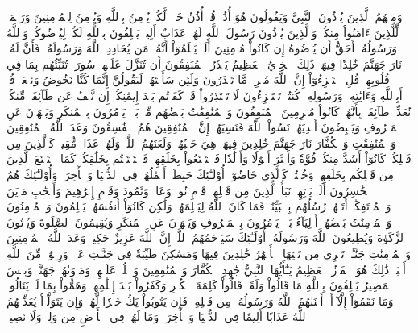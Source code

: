 وَمِنۡهُمُ ٱلَّذِينَ يُؤۡذُونَ ٱلنَّبِيَّ وَيَقُولُونَ هُوَ أُذُنٞۚ قُلۡ أُذُنُ خَيۡرٖ لَّكُمۡ يُؤۡمِنُ بِٱللَّهِ وَيُؤۡمِنُ لِلۡمُؤۡمِنِينَ وَرَحۡمَةٞ لِّلَّذِينَ ءَامَنُواْ مِنكُمۡۚ وَٱلَّذِينَ يُؤۡذُونَ رَسُولَ ٱللَّهِ لَهُمۡ عَذَابٌ أَلِيمٞ
يَحۡلِفُونَ بِٱللَّهِ لَكُمۡ لِيُرۡضُوكُمۡ وَٱللَّهُ وَرَسُولُهُۥٓ أَحَقُّ أَن يُرۡضُوهُ إِن كَانُواْ مُؤۡمِنِينَ
أَلَمۡ يَعۡلَمُوٓاْ أَنَّهُۥ مَن يُحَادِدِ ٱللَّهَ وَرَسُولَهُۥ فَأَنَّ لَهُۥ نَارَ جَهَنَّمَ خَٰلِدٗا فِيهَاۚ ذَٰلِكَ ٱلۡخِزۡيُ ٱلۡعَظِيمُ
يَحۡذَرُ ٱلۡمُنَٰفِقُونَ أَن تُنَزَّلَ عَلَيۡهِمۡ سُورَةٞ تُنَبِّئُهُم بِمَا فِي قُلُوبِهِمۡۚ قُلِ ٱسۡتَهۡزِءُوٓاْ إِنَّ ٱللَّهَ مُخۡرِجٞ مَّا تَحۡذَرُونَ
وَلَئِن سَأَلۡتَهُمۡ لَيَقُولُنَّ إِنَّمَا كُنَّا نَخُوضُ وَنَلۡعَبُۚ قُلۡ أَبِٱللَّهِ وَءَايَٰتِهِۦ وَرَسُولِهِۦ كُنتُمۡ تَسۡتَهۡزِءُونَ
لَا تَعۡتَذِرُواْ قَدۡ كَفَرۡتُم بَعۡدَ إِيمَٰنِكُمۡۚ إِن نَّعۡفُ عَن طَآئِفَةٖ مِّنكُمۡ نُعَذِّبۡ طَآئِفَةَۢ بِأَنَّهُمۡ كَانُواْ مُجۡرِمِينَ
ٱلۡمُنَٰفِقُونَ وَٱلۡمُنَٰفِقَٰتُ بَعۡضُهُم مِّنۢ بَعۡضٖۚ يَأۡمُرُونَ بِٱلۡمُنكَرِ وَيَنۡهَوۡنَ عَنِ ٱلۡمَعۡرُوفِ وَيَقۡبِضُونَ أَيۡدِيَهُمۡۚ نَسُواْ ٱللَّهَ فَنَسِيَهُمۡۚ إِنَّ ٱلۡمُنَٰفِقِينَ هُمُ ٱلۡفَٰسِقُونَ
وَعَدَ ٱللَّهُ ٱلۡمُنَٰفِقِينَ وَٱلۡمُنَٰفِقَٰتِ وَٱلۡكُفَّارَ نَارَ جَهَنَّمَ خَٰلِدِينَ فِيهَاۚ هِيَ حَسۡبُهُمۡۚ وَلَعَنَهُمُ ٱللَّهُۖ وَلَهُمۡ عَذَابٞ مُّقِيمٞ
كَٱلَّذِينَ مِن قَبۡلِكُمۡ كَانُوٓاْ أَشَدَّ مِنكُمۡ قُوَّةٗ وَأَكۡثَرَ أَمۡوَٰلٗا وَأَوۡلَٰدٗا فَٱسۡتَمۡتَعُواْ بِخَلَٰقِهِمۡ فَٱسۡتَمۡتَعۡتُم بِخَلَٰقِكُمۡ كَمَا ٱسۡتَمۡتَعَ ٱلَّذِينَ مِن قَبۡلِكُم بِخَلَٰقِهِمۡ وَخُضۡتُمۡ كَٱلَّذِي خَاضُوٓاْۚ أُوْلَـٰٓئِكَ حَبِطَتۡ أَعۡمَٰلُهُمۡ فِي ٱلدُّنۡيَا وَٱلۡأٓخِرَةِۖ وَأُوْلَـٰٓئِكَ هُمُ ٱلۡخَٰسِرُونَ
أَلَمۡ يَأۡتِهِمۡ نَبَأُ ٱلَّذِينَ مِن قَبۡلِهِمۡ قَوۡمِ نُوحٖ وَعَادٖ وَثَمُودَ وَقَوۡمِ إِبۡرَٰهِيمَ وَأَصۡحَٰبِ مَدۡيَنَ وَٱلۡمُؤۡتَفِكَٰتِۚ أَتَتۡهُمۡ رُسُلُهُم بِٱلۡبَيِّنَٰتِۖ فَمَا كَانَ ٱللَّهُ لِيَظۡلِمَهُمۡ وَلَٰكِن كَانُوٓاْ أَنفُسَهُمۡ يَظۡلِمُونَ
وَٱلۡمُؤۡمِنُونَ وَٱلۡمُؤۡمِنَٰتُ بَعۡضُهُمۡ أَوۡلِيَآءُ بَعۡضٖۚ يَأۡمُرُونَ بِٱلۡمَعۡرُوفِ وَيَنۡهَوۡنَ عَنِ ٱلۡمُنكَرِ وَيُقِيمُونَ ٱلصَّلَوٰةَ وَيُؤۡتُونَ ٱلزَّكَوٰةَ وَيُطِيعُونَ ٱللَّهَ وَرَسُولَهُۥٓۚ أُوْلَـٰٓئِكَ سَيَرۡحَمُهُمُ ٱللَّهُۗ إِنَّ ٱللَّهَ عَزِيزٌ حَكِيمٞ
وَعَدَ ٱللَّهُ ٱلۡمُؤۡمِنِينَ وَٱلۡمُؤۡمِنَٰتِ جَنَّـٰتٖ تَجۡرِي مِن تَحۡتِهَا ٱلۡأَنۡهَٰرُ خَٰلِدِينَ فِيهَا وَمَسَٰكِنَ طَيِّبَةٗ فِي جَنَّـٰتِ عَدۡنٖۚ وَرِضۡوَٰنٞ مِّنَ ٱللَّهِ أَكۡبَرُۚ ذَٰلِكَ هُوَ ٱلۡفَوۡزُ ٱلۡعَظِيمُ
يَـٰٓأَيُّهَا ٱلنَّبِيُّ جَٰهِدِ ٱلۡكُفَّارَ وَٱلۡمُنَٰفِقِينَ وَٱغۡلُظۡ عَلَيۡهِمۡۚ وَمَأۡوَىٰهُمۡ جَهَنَّمُۖ وَبِئۡسَ ٱلۡمَصِيرُ
يَحۡلِفُونَ بِٱللَّهِ مَا قَالُواْ وَلَقَدۡ قَالُواْ كَلِمَةَ ٱلۡكُفۡرِ وَكَفَرُواْ بَعۡدَ إِسۡلَٰمِهِمۡ وَهَمُّواْ بِمَا لَمۡ يَنَالُواْۚ وَمَا نَقَمُوٓاْ إِلَّآ أَنۡ أَغۡنَىٰهُمُ ٱللَّهُ وَرَسُولُهُۥ مِن فَضۡلِهِۦۚ فَإِن يَتُوبُواْ يَكُ خَيۡرٗا لَّهُمۡۖ وَإِن يَتَوَلَّوۡاْ يُعَذِّبۡهُمُ ٱللَّهُ عَذَابًا أَلِيمٗا فِي ٱلدُّنۡيَا وَٱلۡأٓخِرَةِۚ وَمَا لَهُمۡ فِي ٱلۡأَرۡضِ مِن وَلِيّٖ وَلَا نَصِيرٖ
